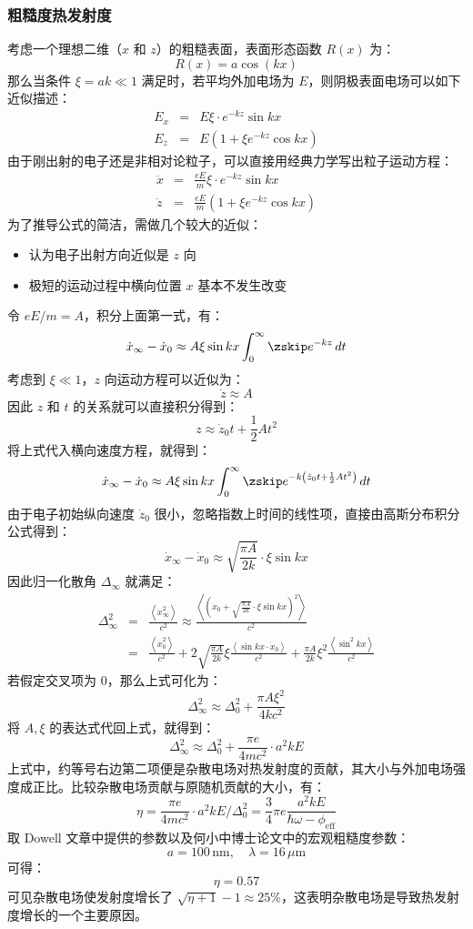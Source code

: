 \subsubsection{粗糙度热发射度}
考虑一个理想二维（$x$ 和 $z$）的粗糙表面，表面形态函数 $R(x)$ 为：
\[
	R(x) = a\cos(kx)
\]
那么当条件 $\xi=ak\ll 1$ 满足时，若平均外加电场为 $E$，则阴极表面电场可以如下近似描述：
\begin{eqnarray*}
E_x &=& E\xi\cdot e^{-kz}\sin kx \\
E_z &=& E\left(1+\xi e^{-kz}\cos kx\right)
\end{eqnarray*}
由于刚出射的电子还是非相对论粒子，可以直接用经典力学写出粒子运动方程：
\begin{eqnarray*}
\ddot{x} &=& \frac{eE}{m}\xi\cdot e^{-kz}\sin kx \\
\ddot{z} &=& \frac{eE}{m}\left(1+\xi e^{-kz}\cos kx\right)
\end{eqnarray*}
为了推导公式的简洁，需做几个较大的近似：
\begin{itemize}
\item 认为电子出射方向近似是 $z$ 向
\item 极短的运动过程中横向位置 $x$ 基本不发生改变
\end{itemize}
令 $eE/m=A$，积分上面第一式，有：
\[
	\dot{x}_{\infty} - \dot{x}_0 \approx A\xi\sin kx\int_0^{\infty}\zskip e^{-kz}\,dt
\]
考虑到 $\xi \ll 1$，$z$ 向运动方程可以近似为：
\[
\ddot{z}\approx A
\]
因此 $z$ 和 $t$ 的关系就可以直接积分得到：
\[
z\approx \dot{z}_0 t + \dfrac{1}{2}At^2
\]
将上式代入横向速度方程，就得到：
\[
	\dot{x}_{\infty} - \dot{x}_0 \approx A\xi\sin kx\int_0^{\infty}\zskip e^{-k\left(\dot{z}_0 t + \frac{1}{2}At^2\right)}\,dt
\]
由于电子初始纵向速度 $\dot{z}_0$ 很小，忽略指数上时间的线性项，直接由高斯分布积分公式得到：
\[
	\dot{x}_{\infty} - \dot{x}_0 \approx \sqrt{\frac{\pi A}{2k}}\cdot\xi\sin kx
\]
因此归一化散角 $\Delta_{\infty}$ 就满足：
\begin{eqnarray*}
\Delta_{\infty}^2 &=& \frac{\left\langle\dot{x}_{\infty}^2\right\rangle}{c^2} \approx \frac{\left\langle\left(\dot{x}_0 + \sqrt{\frac{\pi A}{2k}}\cdot\xi\sin kx\right)^2\right\rangle}{c^2} \\
	&=& \frac{\left\langle\dot{x}_{0}^2\right\rangle}{c^2} + 2\sqrt{\frac{\pi A}{2k}}\xi\frac{\left\langle\sin kx\cdot\dot{x}_{0}\right\rangle}{c^2} + \frac{\pi A}{2k}\xi^2\frac{\left\langle\sin^2 kx\right\rangle}{c^2}
\end{eqnarray*}
若假定交叉项为 0，那么上式可化为：
\[
	\Delta_{\infty}^2 \approx \Delta_{0}^2 + \frac{\pi A\xi^2}{4kc^2}
\]
将 $A,\xi$ 的表达式代回上式，就得到：
\[
	\Delta_{\infty}^2 \approx \Delta_{0}^2 + \frac{\pi e}{4mc^2}\cdot a^2kE
\]
上式中，约等号右边第二项便是杂散电场对热发射度的贡献，其大小与外加电场强度成正比。比较杂散电场贡献与原随机贡献的大小，有：
\[
	\eta = \frac{\pi e}{4mc^2}\cdot a^2kE/\Delta_{0}^2 = \dfrac{3}{4}\pi e\dfrac{a^2kE}{\hbar\omega-\phi_{\text{eff}}}
\]
取 Dowell 文章中提供的参数以及何小中博士论文中的宏观粗糙度参数：
\[
	a = 100\,\text{nm},\quad
	\lambda = 16\,\mu\text{m}
\]
可得：
\[
	\eta = 0.57
\]
可见杂散电场使发射度增长了 $\sqrt{\eta+1}-1\approx 25\%$，这表明杂散电场是导致热发射度增长的一个主要原因。

